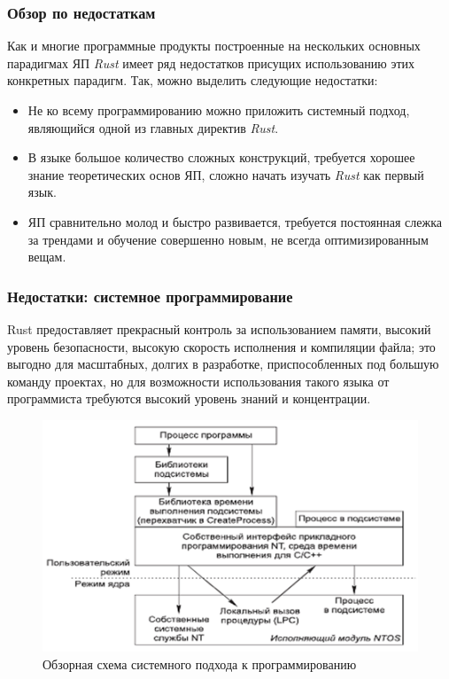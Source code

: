 \documentclass[11pt]{beamer}
\begin{document}
\begin{frame}
\frametitle{Обзор по недостаткам}
Как и многие программные продукты построенные на нескольких основных парадигмах ЯП \textit{Rust} имеет ряд недостатков присущих использованию этих конкретных парадигм. Так, можно выделить следующие недостатки:
\begin{itemize} 
    \item Не ко всему программированию можно приложить системный подход, являющийся одной из главных директив \textit{Rust}.
    \item В языке большое количество сложных конструкций, требуется хорошее знание теоретических основ ЯП, сложно начать изучать \textit{Rust} как первый язык.
    \item ЯП сравнительно молод и быстро развивается, требуется постоянная слежка за трендами и обучение совершенно новым, не всегда оптимизированным вещам.
\end{itemize}
\end{frame}
\begin{frame}
\frametitle{Недостатки: системное программирование}
Rust предоставляет прекрасный контроль за использованием памяти, высокий уровень безопасности, высокую скорость исполнения и компиляции файла; это выгодно для масштабных, долгих в разработке, приспособленных под большую команду проектах, но для возможности использования такого языка от программиста требуются высокий уровень знаний и концентрации.
\begin{figure}
    \centering
    \includegraphics[width=0.5\linewidth]{image12.png}
    \caption{Обзорная схема системного подхода к программированию}
\end{figure}
\end{frame}
\end{document}
